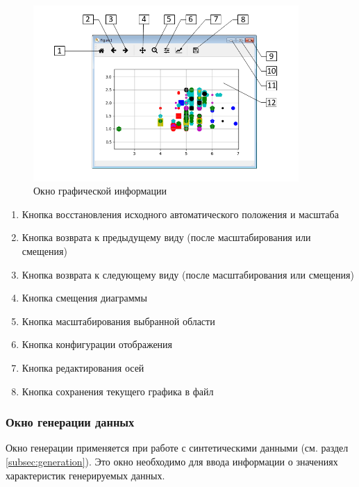 \documentclass[12pt,twoside,a4paper,tikz,border=5]{refart}
\begin{document}
\begin{figure}[h!]
	\centering
	\includegraphics[width=0.9\textwidth]{img/plotview}
	\caption{Окно графической информации}
	\label{fig:plottview}
\end{figure}

\begin{enumerate}
	\item Кнопка восстановления исходного автоматического положения и масштаба
	\item Кнопка возврата к предыдущему виду (после масштабирования или смещения)
	\item Кнопка возврата к следующему виду (после масштабирования или смещения)
	\item Кнопка смещения диаграммы
	\item Кнопка масштабирования выбранной области
	\item Кнопка конфигурации отображения
	\item Кнопка редактирования осей
	\item Кнопка сохранения текущего графика в файл
\end{enumerate}

\subsubsection{Окно генерации данных}

Окно генерации применяется при работе с синтетическими данными (см. раздел \ref{subsec:generation}). Это окно необходимо для ввода информации о значениях характеристик генерируемых данных.
\end{document}
